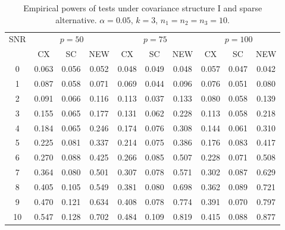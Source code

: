 \documentclass[12pt]{article} %
\theoremstyle{definition}
\begin{document}
\begin{table}[!hbp]
    \caption{Empirical powers of tests under covariance structure I and sparse alternative. $\alpha=0.05$, $k=3$, $n_1=n_2=n_3=10$. }
    \label{table3}
\centering
\begin{tabular}{*{10}{c}}
\toprule
\multirow{2}{*}{SNR} &\multicolumn{3}{c}{$p=50$}&\multicolumn{3}{c}{$p=75$}&\multicolumn{3}{c}{$p=100$} \\
    \cmidrule(r){2-4}\cmidrule(r){5-7}\cmidrule(r){8-10}
        & CX & SC & NEW & CX &SC &NEW &CX & SC & NEW\\
\midrule
0 & 0.063 & 0.056 & 0.052 & 0.048 & 0.049 & 0.048 & 0.057 & 0.047 & 0.042 \\ 
1 & 0.087 & 0.058 & 0.071 & 0.069 & 0.044 & 0.096 & 0.076 & 0.051 & 0.080 \\ 
2 & 0.091 & 0.066 & 0.116 & 0.113 & 0.037 & 0.133 & 0.080 & 0.058 & 0.139 \\ 
3 & 0.155 & 0.065 & 0.177 & 0.131 & 0.062 & 0.228 & 0.113 & 0.058 & 0.218 \\ 
4 & 0.184 & 0.065 & 0.246 & 0.174 & 0.076 & 0.308 & 0.144 & 0.061 & 0.310 \\ 
5 & 0.225 & 0.081 & 0.337 & 0.214 & 0.075 & 0.386 & 0.176 & 0.083 & 0.417 \\ 
6 & 0.270 & 0.088 & 0.425 & 0.266 & 0.085 & 0.507 & 0.228 & 0.071 & 0.508 \\ 
7 & 0.364 & 0.080 & 0.501 & 0.307 & 0.078 & 0.571 & 0.302 & 0.087 & 0.629 \\ 
8 & 0.405 & 0.105 & 0.549 & 0.381 & 0.080 & 0.698 & 0.362 & 0.089 & 0.721 \\ 
9 & 0.470 & 0.121 & 0.634 & 0.408 & 0.078 & 0.774 & 0.391 & 0.070 & 0.797 \\ 
10 & 0.547 & 0.128 & 0.702 & 0.484 & 0.109 & 0.819 & 0.415 & 0.088 & 0.877 \\ 
\bottomrule
\end{tabular}
\end{table}
\end{document}
